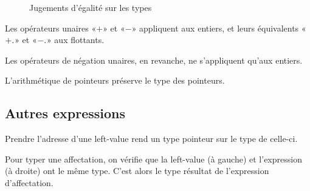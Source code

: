 \begin{mathpar}
\end{mathpar}

\begin{figure}[h]


  \begin{mathpar}



  \end{mathpar}

\caption{Jugements d'égalité sur les types}
\label{fig:jugement-eq}
\end{figure}

Les opérateurs unaires «$+$» et «$-$» appliquent aux entiers, et leurs
équivalents «$\floatop{+}$» et «$\floatop{-}$» aux flottants.


Les opérateurs de négation unaires, en revanche, ne s'appliquent qu'aux
entiers.

\begin{mathpar}
\end{mathpar}

L'arithmétique de pointeurs préserve le type des pointeurs.

\begin{mathpar}
\end{mathpar}

\subsection*{Autres expressions}

Prendre l'adresse d'une left-value rend un type pointeur sur le type de
celle-ci.

\begin{mathpar}
\end{mathpar}

Pour typer une affectation, on vérifie que la left-value (à gauche) et
l'expression (à droite) ont le même type. C'est alors le type résultat de
l'expression d'affectation.

